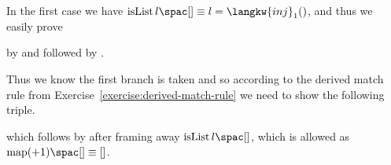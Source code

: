 \begin{example}
In the first case we have
$\isList {l} {[]} \equiv l = \langkw{inj}_1()$, and thus we
easily prove
\begin{mathpar}
\end{mathpar}
by  and  followed by .

Thus we know the first branch is taken and so according to the derived match rule from Exercise~\ref{exercise:derived-match-rule} we need to show the following triple.
\begin{mathpar}
\end{mathpar}
which follows by  after framing away $\isList {l} {[]}$, which is allowed as $\map {(+1)} {[]} \equiv []$.


\end{example}
